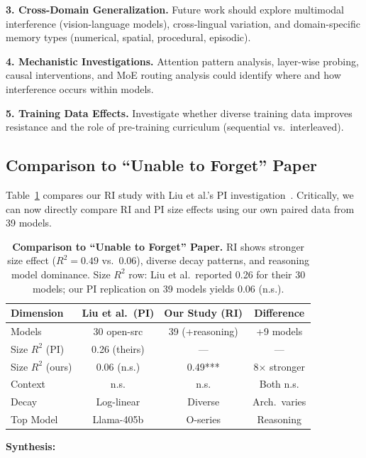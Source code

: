 \documentclass{article}
\begin{document}
\textbf{3. Cross-Domain Generalization.}
Future work should explore multimodal interference (vision-language models), cross-lingual variation, and domain-specific memory types (numerical, spatial, procedural, episodic).

\textbf{4. Mechanistic Investigations.}
Attention pattern analysis, layer-wise probing, causal interventions, and MoE routing analysis could identify where and how interference occurs within models.

\textbf{5. Training Data Effects.}
Investigate whether diverse training data improves resistance and the role of pre-training curriculum (sequential vs.\ interleaved).

\subsection{Comparison to ``Unable to Forget'' Paper}

Table~\ref{tab:comparison_unable_forget} compares our RI study with Liu et al.'s PI investigation~\citep{liu2024unable}. Critically, we can now directly compare RI and PI size effects using our own paired data from 39 models.

\begin{table}[t]
\centering
\small
\caption{\textbf{Comparison to ``Unable to Forget'' Paper.} RI shows stronger size effect ($R^2 = 0.49$ vs.\ $0.06$), diverse decay patterns, and reasoning model dominance. Size $R^2$ row: Liu et al.\ reported 0.26 for their 30 models; our PI replication on 39 models yields 0.06 (n.s.).}
\label{tab:comparison_unable_forget}
\setlength{\tabcolsep}{4pt}
\begin{tabular}{@{}lccc@{}}
\toprule
Dimension & Liu et al.\ (PI) & Our Study (RI) & Difference \\
\midrule
Models & 30 open-src & 39 (+reasoning) & +9 models \\
Size $R^2$ (PI) & 0.26 (theirs) & --- & --- \\
Size $R^2$ (ours) & 0.06 (n.s.) & 0.49*** & 8$\times$ stronger \\
Context & n.s. & n.s. & Both n.s. \\
Decay & Log-linear & Diverse & Arch.\ varies \\
Top Model & Llama-405b & O-series & Reasoning \\
\bottomrule
\end{tabular}
\end{table}

\textbf{Synthesis:}
\end{document}
